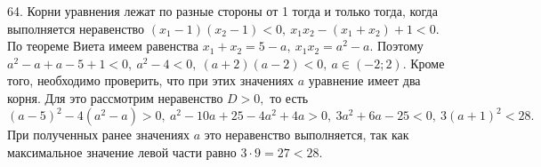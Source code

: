 64. Корни уравнения лежат по разные стороны от 1 тогда и только тогда, когда выполняется неравенство $(x_1-1)(x_2-1)<0,\ x_1x_2-(x_1+x_2)+1<0.$ По теореме Виета имеем равенства $x_1+x_2=5-a,\ x_1x_2=a^2-a.$ Поэтому $a^2-a+a-5+1<0,\
a^2-4<0,\ (a+2)(a-2)<0,\ a\in(-2;2).$ Кроме того, необходимо проверить, что при этих значениях $a$ уравнение имеет два корня. Для это рассмотрим неравенство $D>0,$ то есть $(a-5)^2-4(a^2-a)>0,\ a^2-10a+25-4a^2+4a>0,\ 3a^2+6a-25<0,\ 3(a+1)^2<28.$ При полученных ранее значениях $a$ это неравенство выполняется, так как максимальное значение левой части равно $3\cdot9=27<28.$\\
